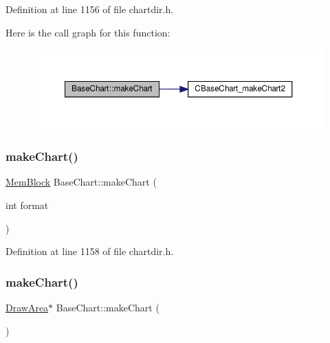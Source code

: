 Definition at line 1156 of file chartdir.\+h.

Here is the call graph for this function\+:
\nopagebreak
\begin{figure}[H]
\begin{center}
\leavevmode
\includegraphics[width=350pt]{class_base_chart_a7b18e9ce35315e1cdbe3f829896b2ba7_cgraph}
\end{center}
\end{figure}
\mbox{\label{class_base_chart_a97cefd6a0a1a6a9cd496396624de75e1}} 
\subsubsection{\texorpdfstring{make\+Chart()}{makeChart()}\hspace{0.1cm}{\footnotesize\ttfamily [3/4]}}
{\footnotesize\ttfamily \hyperlink{class_mem_block}{Mem\+Block} Base\+Chart\+::make\+Chart (\begin{DoxyParamCaption}\item[{int}]{format }\end{DoxyParamCaption})\hspace{0.3cm}{\ttfamily [inline]}}



Definition at line 1158 of file chartdir.\+h.

\mbox{\label{class_base_chart_a72d9fdf1ba817ccc84e874c36317f5e7}} 
\subsubsection{\texorpdfstring{make\+Chart()}{makeChart()}\hspace{0.1cm}{\footnotesize\ttfamily [4/4]}}
{\footnotesize\ttfamily \hyperlink{class_draw_area}{Draw\+Area}$\ast$ Base\+Chart\+::make\+Chart (\begin{DoxyParamCaption}{ }\end{DoxyParamCaption})\hspace{0.3cm}{\ttfamily [inline]}}



